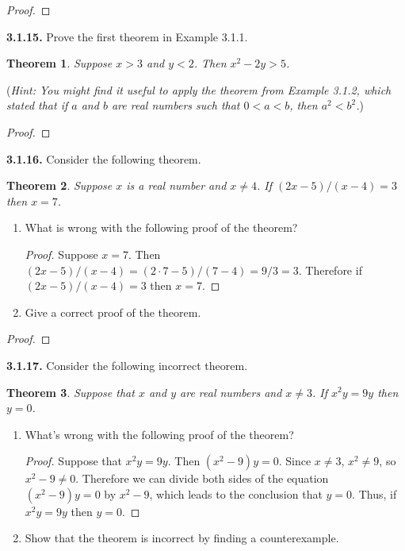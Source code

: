 \documentclass[12pt]{amsart}
\newenvironment{statement}[1]{\smallskip\noindent\color[rgb]{.6627, .3529, .6314} {\bf #1.}}{}
\newtheorem{theorem}{Theorem}
\theoremstyle{definition}
\theoremstyle{remark}
\begin{document}
\begin{proof}
\end{proof}

\begin{statement}{3.1.15}
Prove the first theorem in Example 3.1.1.
\begin{theorem}
	Suppose $x > 3$ and $y < 2$.
	Then $x^2 - 2y > 5$.
\end{theorem}
(\emph{Hint: You might find it useful to apply the theorem from Example 3.1.2,
which stated that if $a$ and $b$ are real numbers such that $0 < a < b$, then $a^2 < b^2$.})
\end{statement}

\begin{proof}
\end{proof}


\begin{statement}{3.1.16}
Consider the following theorem.
\begin{theorem}
	Suppose $x$ is a real number and $x \neq 4$.
	If $(2x - 5) / (x - 4) = 3$ then $x = 7$.
\end{theorem}
\begin{enumerate}
	\item What is wrong with the following proof of the theorem?
	\begin{proof}
		Suppose $x = 7$.
		Then $(2x - 5) / (x - 4) = (2 \cdot 7 - 5) / (7 - 4) = 9/3 = 3$.
		Therefore if $(2x - 5) / (x - 4) = 3$ then $x = 7$.
	\end{proof}
	
	\item Give a correct proof of the theorem.
\end{enumerate}
\end{statement}

\begin{proof}
\end{proof}


\begin{statement}{3.1.17}
Consider the following incorrect theorem.
\begin{theorem}
	Suppose that $x$ and $y$ are real numbers and $x \neq 3$.
	If $x^2y = 9y$ then $y = 0$.
\end{theorem}
\begin{enumerate}
	\item What's wrong with the following proof of the theorem?
	\begin{proof}
		Suppose that $x^2y = 9y$.
		Then $(x^2 - 9)y = 0$.
		Since $x \neq 3$, $x^2 \neq 9$, so $x^2 - 9 \neq 0$.
		Therefore we can divide both sides of the equation $(x^2 - 9)y = 0$ by $x^2 - 9$,
		which leads to the conclusion that $y = 0$.
		Thus, if $x^2y = 9y$ then $y = 0$.
	\end{proof}
	
	\item Show that the theorem is incorrect by finding a counterexample.
\end{enumerate}
\end{statement}
\end{document}
